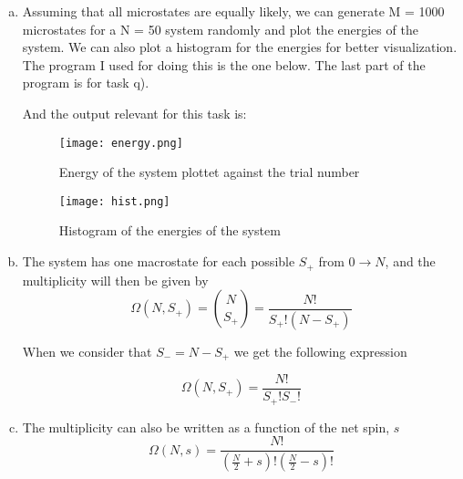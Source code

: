 \documentclass[a4paper,norsk,12pt,oneside]{article}
\begin{document}
\begin{enumerate}[a)]
    \item

        Assuming that all microstates are equally likely, we can generate M = 1000
        microstates for a N = 50 system randomly and plot the energies of the system.
        We can also plot a histogram for the energies for better visualization. 
        The program I used for doing this is the one below. The last part of the 
        program is for task q). 

        
          

        And the output relevant for this task is: 

         \begin{figure}[H]
            \centering %
            \texttt{[image: energy.png]}
            \caption{Energy of the system plottet against the trial number} 
            \end{figure} 

            \begin{figure}[H]
            \centering %
            \texttt{[image: hist.png]}
            \caption{Histogram of the energies of the system} 
            \end{figure}  

    \item

        The system has one macrostate for each possible \(S_+\) from \(0 \rightarrow N\),
        and the multiplicity will then be given by
        \begin{equation*}
            \Omega(N, S_+) = \binom{N}{S_+} = \frac{N!}{S_+!(N-S_+)}
        \end{equation*}

        When we consider that \(S_- = N - S_+\) we get the following expression

        \begin{equation*}
            \Omega(N, S_+) = \frac{N!}{S_+!S_-!}
        \end{equation*}

    \item

        The multiplicity can also be written as a function of the net spin, \(s\)
        \begin{equation*}
            \Omega(N, s) = \frac{N!}{\left (\frac{N}{2} + s \right )! \left (\frac{N}{2} - s 
        \right )!} 
        \end{equation*}


\end{enumerate}
\end{document}
